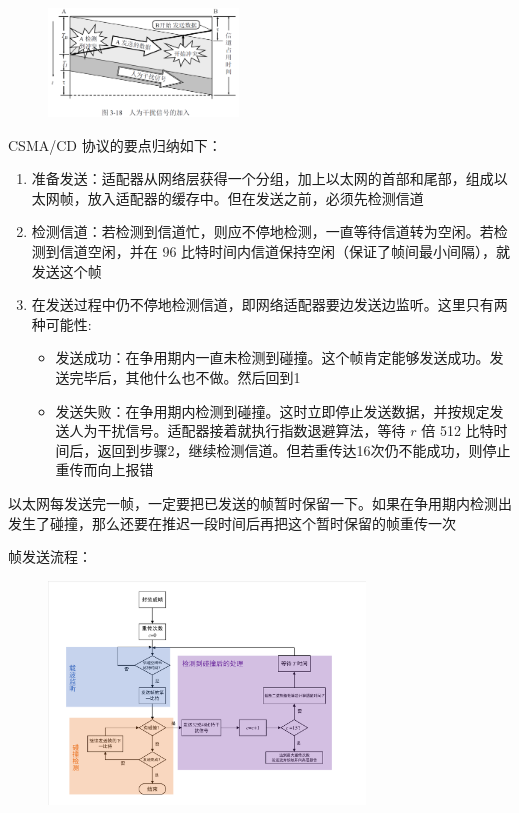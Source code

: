 \documentclass[cs4size,a4paper,10pt]{ctexart}
\begin{document}
	\begin{figure}[H]
		\centering
		\includegraphics[width=0.45\textwidth]{img/3.18}
	\end{figure}

	CSMA/CD 协议的要点归纳如下：
	\begin{enumerate}[label=\arabic*.]
		\item 准备发送：适配器从网络层获得一个分组，加上以太网的首部和尾部，组成以太网帧，放入适配器的缓存中。但在发送之前，必须先检测信道
		\item 检测信道：若检测到信道忙，则应不停地检测，一直等待信道转为空闲。若检测到信道空闲，并在 96 比特时间内信道保持空闲（保证了帧间最小间隔），就发送这个帧
		\item 在发送过程中仍不停地检测信道，即网络适配器要边发送边监听。这里只有两种可能性:
		\begin{itemize}
			\item 发送成功：在争用期内一直未检测到碰撞。这个帧肯定能够发送成功。发送完毕后，其他什么也不做。然后回到1
			\item 发送失败：在争用期内检测到碰撞。这时立即停止发送数据，并按规定发送人为干扰信号。适配器接着就执行指数退避算法，等待 $r$ 倍 512 比特时间后，返回到步骤2，继续检测信道。但若重传达16次仍不能成功，则停止重传而向上报错
		\end{itemize}
	\end{enumerate}

	以太网每发送完一帧，一定要把已发送的帧暂时保留一下。如果在争用期内检测出发生了碰撞，那么还要在推迟一段时间后再把这个暂时保留的帧重传一次

	帧发送流程：
	\begin{figure}[H]
		\centering
		\includegraphics[width=0.75\textwidth]{img/3.4.2.1}
	\end{figure}
\end{document}
